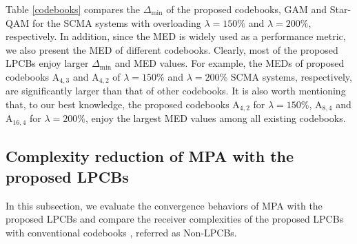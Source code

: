 \documentclass[journal]{IEEEtran}
\begin{document}
Table \ref{codebooks} compares  the  $\Delta_{\min}$  of the proposed  codebooks, GAM and Star-QAM for the  SCMA  systems with overloading $\lambda =150\%$ and $\lambda = 200\%$, respectively. In addition, since the MED is widely used as a performance metric, we also present the MED of different codebooks. 
Clearly, most of the proposed LPCBs enjoy larger $\Delta_{\min}$ and MED values. %
For example,  the  MEDs of proposed codebooks $\text{A}_{4,3}$ and $\text{A}_{4,2}$ of $\lambda =150\%$ and $\lambda = 200\%$ SCMA systems, respectively,  are significantly larger than that of other codebooks. %
 It is also  worth mentioning that, to our   best knowledge, the proposed codebooks $\text{A}_{4,2}$ for  $ \lambda = 150\%$,    $\text{A}_{8,4 }$ and $\text{A}_{16,4}$ for $ \lambda = 200\%$,  enjoy the largest  MED values  among all existing codebooks. 


  
\subsection{Complexity reduction of MPA with the  proposed LPCBs}  
In this subsection, we evaluate the  convergence behaviors of MPA  with the proposed LPCBs  and compare the receiver complexities of the proposed LPCBs with conventional codebooks  \cite{mheich2018design,yan2016top,deka2020design,yu2015optimized,klimentyev2017scma,Zhang,li2020design,chen2020design}, referred as Non-LPCBs.  
\end{document}
